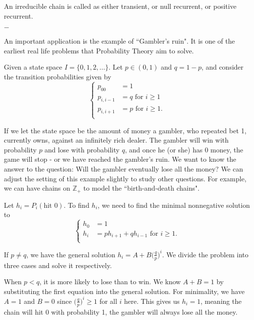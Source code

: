 \documentclass[11pt, a4paper, oneside]{book}
\theoremstyle{definition}
\def\Z{\mathbb{Z}}
\newcommand{\breaking}{%
    \begin{center}
    $-$
    \end{center}%
}
\begin{document}
\noindent An irreducible chain is called as either transient, or null recurrent, or positive recurrent. 

\breaking 

\noindent An important application is the example of ``Gambler's ruin". It is one of the earliest real life problems that Probability Theory aim to solve. 

\noindent Given a state space $I = \{ 0, 1, 2, \dots \}$. Let $p \in (0,1)$ and $q = 1 - p$, and consider the transition probabilities given by
\begin{equation*}
\begin{cases}
p_{00} &= 1 \\
p_{i, i-1} &= q \text{ for } i \ge 1 \\
p_{i, i+1} &= p \text{ for } i \ge 1. \\
\end{cases}
\end{equation*}

\noindent If we let the state space be the amount of money a gambler, who repeated bet 1, currently owns, against an infinitely rich dealer. The gambler will win with probability $p$ and lose with probability $q$, and once he (or she) has 0 money, the game will stop - or we have reached the gambler's ruin. We want to know the answer to the question: Will the gambler eventually lose all the money? We can adjust the setting of this example slightly to study other questions. For example, we can have chains on $\Z_{+}$ to model the ``birth-and-death chains".

\noindent Let $h_i = P_i(\text{hit }0)$. To find $h_i$, we need to find the minimal nonnegative solution to 
\begin{equation*}
\begin{cases}
h_{0} &= 1 \\
h_{i} &= ph_{i+1} + qh_{i-1} \text{ for } i \ge 1. \\
\end{cases}
\end{equation*}

\noindent If $p \neq q$, we have the general solution $h_i = A+B\big(\frac{q}{p} \big)^i$. We divide the problem into three cases and solve it respectively. 

\noindent When $p < q$, it is more likely to lose than to win. We know $A+B = 1$ by substituting the first equation into the general solution. For minimality, we have $A = 1$ and $B = 0$ since $\big(\frac{q}{p} \big)^i \ge 1$ for all $i$ here. This gives us $h_i = 1$, meaning the chain will hit 0 with probability 1, the gambler will always lose all the money. 
\end{document}
